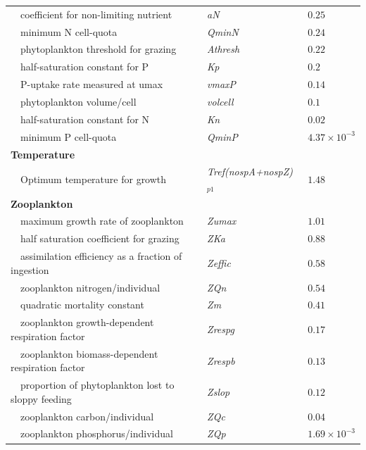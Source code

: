 \documentclass[review]{elsarticle}\usepackage[]{graphicx}\usepackage[]{color}
\begin{document}
\begin{table}[!tbp]
{\begin{center}
\begin{tabular}{lll}
~~coefficient for non-limiting nutrient&\textit{aN}&$0.25$\tabularnewline
~~minimum N cell-quota&\textit{QminN}&$0.24$\tabularnewline
~~phytoplankton threshold for grazing&\textit{Athresh}&$0.22$\tabularnewline
~~half-saturation constant for P&\textit{Kp}&$0.2$\tabularnewline
~~P-uptake rate measured at umax&\textit{vmaxP}&$0.14$\tabularnewline
~~phytoplankton volume/cell&\textit{volcell}&$0.1$\tabularnewline
~~half-saturation constant for N&\textit{Kn}&$0.02$\tabularnewline
~~minimum P cell-quota&\textit{QminP}&$4.37\times 10^{-3}$\tabularnewline
\hline
{\bfseries Temperature}&&\tabularnewline
~~Optimum temperature for growth&\textit{Tref(nospA+nospZ)$_{p1}$}&$1.48$\tabularnewline
\hline
{\bfseries Zooplankton}&&\tabularnewline
~~maximum growth rate of zooplankton&\textit{Zumax}&$1.01$\tabularnewline
~~half saturation coefficient for grazing&\textit{ZKa}&$0.88$\tabularnewline
~~assimilation efficiency as a fraction of ingestion&\textit{Zeffic}&$0.58$\tabularnewline
~~zooplankton nitrogen/individual&\textit{ZQn}&$0.54$\tabularnewline
~~quadratic mortality constant&\textit{Zm}&$0.41$\tabularnewline
~~zooplankton growth-dependent respiration factor&\textit{Zrespg}&$0.17$\tabularnewline
~~zooplankton biomass-dependent respiration factor&\textit{Zrespb}&$0.13$\tabularnewline
~~proportion of phytoplankton lost to sloppy feeding&\textit{Zslop}&$0.12$\tabularnewline
~~zooplankton carbon/individual&\textit{ZQc}&$0.04$\tabularnewline
~~zooplankton phosphorus/individual&\textit{ZQp}&$1.69\times 10^{-3}$\tabularnewline
\hline
\end{tabular}\end{center}}
\end{table}
\end{document}
